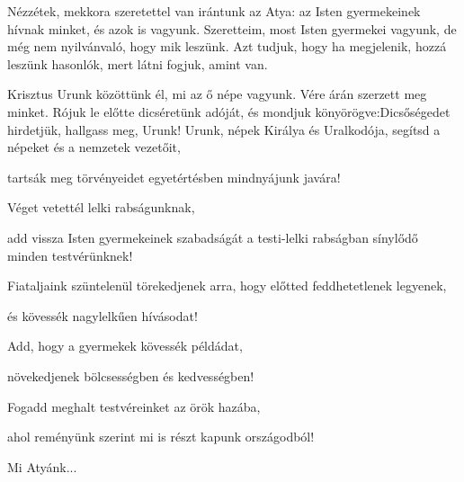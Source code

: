 \documentclass[twoside]{article}
\begin{document}
\begin{psalmsheet}[tone=4, continuous, title={A megváltottak hálaéneke}]
\end{psalmsheet}

Nézzétek, mekkora szeretettel van irántunk az Atya: az Isten gyermekeinek hívnak minket, és azok is vagyunk. Szeretteim, most Isten gyermekei vagyunk, de még nem nyilvánvaló, hogy mik leszünk. Azt tudjuk, hogy ha megjelenik, hozzá leszünk hasonlók, mert látni fogjuk, amint van.



\begin{preces}{Krisztus Urunk közöttünk él, mi az ő népe vagyunk. Vére árán szerzett meg minket. Rójuk le előtte dicséretünk adóját, és mondjuk könyörögve:}{Dicsőségedet hirdetjük, hallgass meg, Urunk!}
  Urunk, népek Királya és Uralkodója, segítsd a népeket és a nemzetek vezetőit,

  \reddash tartsák meg törvényeidet egyetértésben mindnyájunk javára!

  Véget vetettél lelki rabságunknak,

  \reddash add vissza Isten gyermekeinek szabadságát a testi-lelki rabságban sínylődő minden testvérünknek!

  Fiataljaink szüntelenül törekedjenek arra, hogy előtted feddhetetlenek legyenek,

  \reddash és kövessék nagylelkűen hívásodat!

  Add, hogy a gyermekek kövessék példádat,

  \reddash növekedjenek bölcsességben és kedvességben!

  Fogadd meghalt testvéreinket az örök hazába,

  \reddash ahol reményünk szerint mi is részt kapunk országodból!
\end{preces}
Mi Atyánk...
\end{document}
